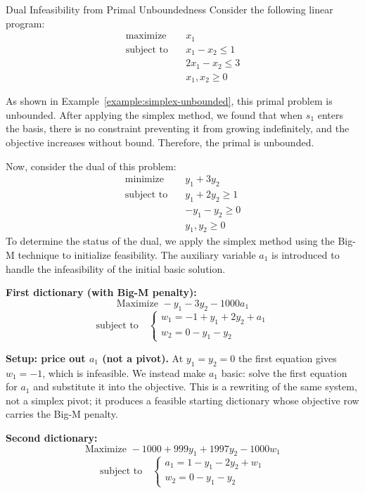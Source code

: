 \begin{example}{Dual Infeasibility from Primal Unboundedness}\label{example:dual-infeasibility-unbounded}
Consider the following linear program:
\[
\begin{aligned}
\text{maximize} \quad & x_1 \\
\text{subject to} \quad
& x_1 - x_2 \leq 1 \\
& 2x_1 - x_2 \leq 3 \\
& x_1, x_2 \geq 0
\end{aligned}
\]

As shown in Example~\ref{example:simplex-unbounded}, this primal problem is unbounded. After applying the simplex method, we found that when \( s_1 \) enters the basis, there is no constraint preventing it from growing indefinitely, and the objective increases without bound. Therefore, the primal is unbounded.

Now, consider the dual of this problem:
\[
\begin{aligned}
\text{minimize} \quad & y_1 + 3y_2 \\
\text{subject to} \quad
& y_1 + 2y_2 \geq 1 \\
& -y_1 - y_2 \geq 0 \\
& y_1, y_2 \geq 0
\end{aligned}
\]
To determine the status of the dual, we apply the simplex method using the Big-M technique to initialize feasibility. The auxiliary variable \( a_1 \) is introduced to handle the infeasibility of the initial basic solution.

\textbf{First dictionary (with Big-M penalty):}
\[
\text{Maximize } -y_1 - 3y_2 - 1000a_1
\]
\[
\text{subject to} \quad
\begin{cases}
w_1 = -1 + y_1 + 2y_2 + a_1 \\
w_2 = 0 - y_1 - y_2
\end{cases}
\]

\textbf{Setup: price out \( a_1 \) (not a pivot).} At \( y_1 = y_2 = 0 \) the first equation gives \( w_1 = -1 \), which is infeasible. We instead make \( a_1 \) basic: solve the first equation for \( a_1 \) and substitute it into the objective. This is a rewriting of the same system, not a simplex pivot; it produces a feasible starting dictionary whose objective row carries the Big-M penalty.

\textbf{Second dictionary:}
\[
\text{Maximize } -1000 + 999y_1 + 1997y_2 - 1000w_1
\]
\[
\text{subject to} \quad
\begin{cases}
a_1 = 1 - y_1 - 2y_2 + w_1 \\
w_2 = 0 - y_1 - y_2
\end{cases}
\]


\end{example}
